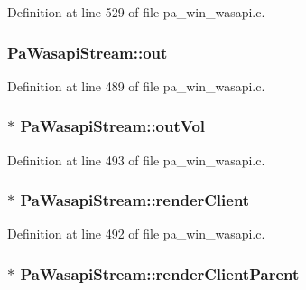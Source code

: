 Definition at line 529 of file pa\+\_\+win\+\_\+wasapi.\+c.

\subsubsection[{\texorpdfstring{out}{out}}]{ Pa\+Wasapi\+Stream\+::out}\hypertarget{struct_pa_wasapi_stream_a995c67eb832e26e5f9e092e06d93799d}{}\label{struct_pa_wasapi_stream_a995c67eb832e26e5f9e092e06d93799d}


Definition at line 489 of file pa\+\_\+win\+\_\+wasapi.\+c.

\subsubsection[{\texorpdfstring{out\+Vol}{outVol}}]{$\ast$ Pa\+Wasapi\+Stream\+::out\+Vol}\hypertarget{struct_pa_wasapi_stream_a91aaed1fbd340608a77d1515e4445214}{}\label{struct_pa_wasapi_stream_a91aaed1fbd340608a77d1515e4445214}


Definition at line 493 of file pa\+\_\+win\+\_\+wasapi.\+c.

\subsubsection[{\texorpdfstring{render\+Client}{renderClient}}]{$\ast$ Pa\+Wasapi\+Stream\+::render\+Client}\hypertarget{struct_pa_wasapi_stream_a6abc7bc5a7514d6de28dec4a623c2e93}{}\label{struct_pa_wasapi_stream_a6abc7bc5a7514d6de28dec4a623c2e93}


Definition at line 492 of file pa\+\_\+win\+\_\+wasapi.\+c.

\subsubsection[{\texorpdfstring{render\+Client\+Parent}{renderClientParent}}]{$\ast$ Pa\+Wasapi\+Stream\+::render\+Client\+Parent}\hypertarget{struct_pa_wasapi_stream_a28a861cf6e64e4f1b45d4f774052cc42}{}\label{struct_pa_wasapi_stream_a28a861cf6e64e4f1b45d4f774052cc42}


